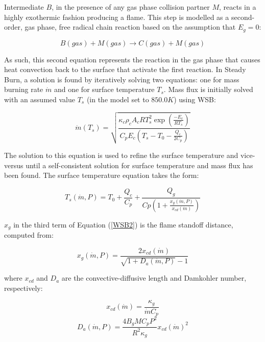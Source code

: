 Intermediate $B$, in the presence of any gas phase collision partner $M$, reacts in a highly exothermic fashion producing a flame.  This step is modelled as a second-order, gas phase, free radical chain reaction based on the assumption that $E_g = 0$:

\begin{equation}
B(gas)+M(gas)\rightarrow C(gas)+M(gas)
\end{equation}

As such, this second equation represents the reaction in the gas phase that causes heat convection back to the surface that activate the first reaction.  In Steady Burn, a solution is found by iteratively solving two equations: one for mass burning rate $\dot{m}$ and one for surface temperature $T_s$.  Mass flux is initially solved with an assumed value $T_s$ (in the model set to $850.0 K$) using WSB:

\begin{equation}
\dot{m}\left(T_s\right)=\sqrt{\frac{\displaystyle \kappa_c \rho_c A_c R T_s^2 \exp\left({\frac{\displaystyle -E_c}{\displaystyle R T_s}}\right)}{\displaystyle C_p E_c \left(T_s - T_0 - \frac{Q_c}{2 C_p}\right)}}
\label{WSB1}
\end{equation}

The solution to this equation is used to refine the surface temperature and vice-versus until a self-consistent solution for surface temperature and mass flux has been found.  The surface temperature equation takes the form:

\begin{equation}
T_s(\dot{m},P)=T_0 + \frac{\displaystyle Q_c}{\displaystyle C_p} + \frac{Q_g}{Cp\left(1+\frac{\displaystyle x_g\left(\dot{m},P\right)}{\displaystyle x_{cd}(\dot{m})}\right)}
\label{WSB2}
\end{equation}

$x_g$ in the third term of Equation (\ref{WSB2}) is the flame standoff distance, computed from:

\begin{equation}
x_g\left(\dot{m},P\right)=\frac{2 x_{cd}\left(\dot{m}\right)}{\displaystyle \sqrt{1 + D_a\left(\dot{m},P\right)} - 1}
\label{WSB3}
\end{equation}

where $x_{cd}$ and $D_a$ are the convective-diffusive length and Damkohler number, respectively:

\begin{equation}
x_{cd} \left(\dot{m}\right)=\frac{\kappa_g}{\displaystyle \dot{m} C_p}
\label{WSB4}
\end{equation}
\begin{equation}
D_a\left(\dot{m},P\right) = \frac{4 B_g M C_p P^2}{\displaystyle R^2 \kappa_g} x_{cd}\left(\dot{m}\right)^2
\label{WSB5}
\end{equation}


